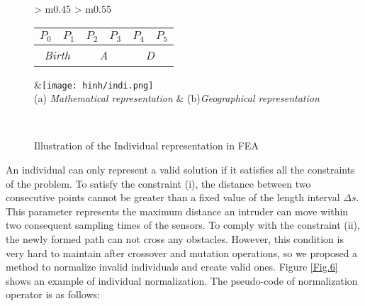 \documentclass[final]{elsarticle}
\begin{document}
\begin{figure*}[h]
	\renewcommand{\arraystretch}{1.5}
	\centering
	\begin{tabular}{ >{\centering\arraybackslash} m{0.45\linewidth} >{\centering\arraybackslash} m{0.55\linewidth} }
		\begin{tabular}{|c|c|c|c|c|c|}
			\hline 
			$P_0$ & $P_1$ & $P_2$ & $P_3$ & $P_4$ & $P_5$  \\
			\hline \hline
			\multicolumn{2}{|c|}{\textit{Birth}} & \multicolumn{2}{c|}{\textit{A}}  & \multicolumn{2}{c|}{\textit{D}}  \\
			\hline
		\end{tabular} &\texttt{[image: hinh/indi.png]} \\
		(a) \textit{Mathematical representation} & (b)\textit{Geographical representation} \\
	\end{tabular}
	\\
	\caption{Illustration of the Individual representation in FEA
	}
	\label{Fig.4}       %
\end{figure*}

An individual can only represent a valid solution if it satisfies all the constraints of the problem. To satisfy the constraint (i), the distance between two consecutive points cannot be greater than a fixed value of the length interval $\Delta s$. This parameter represents the maximum distance an intruder can move within two consequent sampling times of the sensors. To comply with the constraint (ii), the newly formed path can not cross any obstacles. However, this condition is very hard to maintain after crossover and mutation operations, so we proposed a method to normalize invalid individuals and create valid ones. Figure \ref{Fig.6} shows an example of individual normalization. The pseudo-code of normalization operator is as follows:
\end{document}
